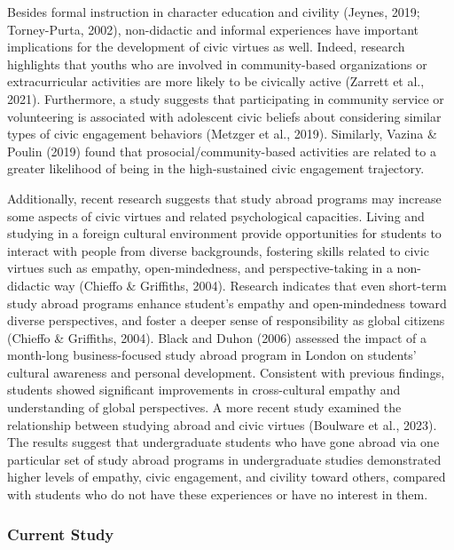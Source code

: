 \documentclass[
  man,
  floatsintext,
  longtable,
  nolmodern,
  notxfonts,
  notimes,
  colorlinks=true,linkcolor=blue,citecolor=blue,urlcolor=blue]{apa7}
\begin{document}
Besides formal instruction in character education and civility (Jeynes,
2019; Torney-Purta, 2002), non-didactic and informal experiences have
important implications for the development of civic virtues as well.
Indeed, research highlights that youths who are involved in
community-based organizations or extracurricular activities are more
likely to be civically active (Zarrett et al., 2021). Furthermore, a
study suggests that participating in community service or volunteering
is associated with adolescent civic beliefs about considering similar
types of civic engagement behaviors (Metzger et al., 2019). Similarly,
Vazina \& Poulin (2019) found that prosocial/community-based activities
are related to a greater likelihood of being in the high-sustained civic
engagement trajectory.

Additionally, recent research suggests that study abroad programs may
increase some aspects of civic virtues and related psychological
capacities. Living and studying in a foreign cultural environment
provide opportunities for students to interact with people from diverse
backgrounds, fostering skills related to civic virtues such as empathy,
open-mindedness, and perspective-taking in a non-didactic way (Chieffo
\& Griffiths, 2004). Research indicates that even short-term study
abroad programs enhance student's empathy and open-mindedness toward
diverse perspectives, and foster a deeper sense of responsibility as
global citizens (Chieffo \& Griffiths, 2004). Black and Duhon (2006)
assessed the impact of a month-long business-focused study abroad
program in London on students' cultural awareness and personal
development. Consistent with previous findings, students showed
significant improvements in cross-cultural empathy and understanding of
global perspectives. A more recent study examined the relationship
between studying abroad and civic virtues (Boulware et al., 2023). The
results suggest that undergraduate students who have gone abroad via one
particular set of study abroad programs in undergraduate studies
demonstrated higher levels of empathy, civic engagement, and civility
toward others, compared with students who do not have these experiences
or have no interest in them.

\subsubsection{Current Study}\label{current-study}
\end{document}

